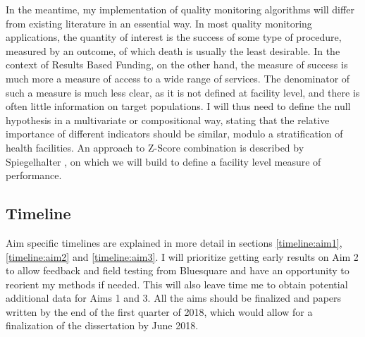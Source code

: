 In the meantime, my implementation of  quality monitoring algorithms will differ from existing literature in an essential way. In most quality monitoring applications, the quantity of interest is the success of some type of procedure, measured by an outcome, of which death is usually the least desirable. In the context of Results Based Funding, on the other hand, the measure of success is much more a measure of access to a wide range of services. The denominator of such a measure is much less clear, as it is not defined at facility level, and there is often little information on target populations. I will thus need to define the null hypothesis in a multivariate or compositional way, stating that the relative importance of different indicators should be similar, modulo a stratification of health facilities. An approach to Z-Score combination is described by Spiegelhalter \cite{spiegelhalter_statistical_2012}, on which we will build to define a facility level measure of performance.


\subsection{Timeline}

Aim specific timelines are explained in more detail in sections \ref{timeline:aim1}, \ref{timeline:aim2} and \ref{timeline:aim3}. I will prioritize getting early results on Aim 2 to allow feedback and field testing from Bluesquare and have an opportunity to reorient my methods if needed. This will also leave time me to obtain potential additional data for Aims 1 and 3. All the aims should be finalized and papers written by the end of the first quarter of 2018, which would allow for a finalization of the dissertation by June 2018.


